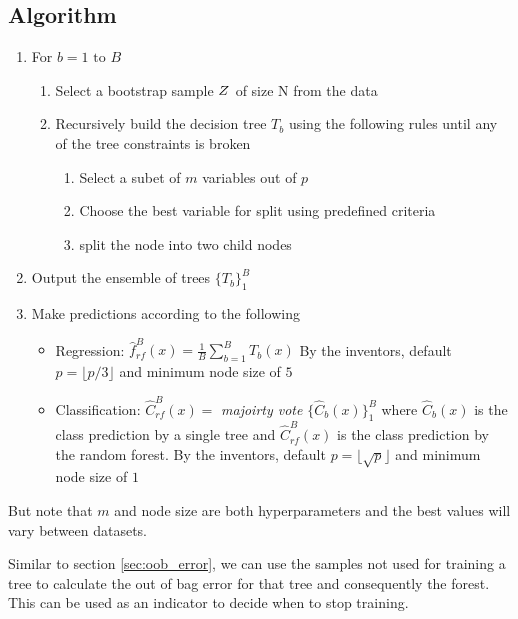 \documentclass[../statistical_learning_notes.tex]{subfiles}
\begin{document}
    \subsection{Algorithm}
    \begin{enumerate}
        \item For $b = 1 \text{ to } B$
        \begin{enumerate}
            \item Select a bootstrap sample $Z^{\*}$ of size N from the data
            \item Recursively build the decision tree $T_{b}$ using the following rules until any of the tree constraints is broken
            \begin{enumerate}
                \item Select a subet of $m$ variables out of $p$
                \item Choose the best variable for split using predefined criteria
                \item split the node into two child nodes
            \end{enumerate}
        \end{enumerate}
        \item Output the ensemble of trees $\{T_{b}\}_{1}^{B}$
        \item Make predictions according to the following
        \begin{itemize}
            \item Regression: $\hat{f}_{rf}^{B}(x) = \frac{1}{B}\sum_{b=1}^{B} T_{b}(x)$\newline
            By the inventors, default $p = \lfloor p/3 \rfloor$ and minimum node size of $5$
            \item Classification: $\hat{C}_{rf}^{B}(x) =$ \emph{majoirty vote} $\{\hat{C}_{b}(x) \}_{1}^{B}$\newline
            where $\hat{C}_{b}(x)$ is the class prediction by a single tree and $\hat{C}_{rf}^{B}(x)$ is the class prediction by the random forest.\newline
            By the inventors, default $p = \lfloor \sqrt{p} \rfloor$ and minimum node size of $1$
        \end{itemize}
    \end{enumerate}
    But note that $m$ and node size are both hyperparameters and the best values will vary between datasets.\newline

    Similar to section \ref{sec:oob_error}, we can use the samples not used for training a tree to calculate the out of bag error for that tree and consequently the forest. This can be used as an indicator to decide when to stop training.
    
\end{document}
